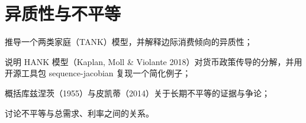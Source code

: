 \chapter{异质性与不平等}\label{ch:heterogeneity}

\begin{chapterguide}
\begin{guidegoals}
\item 推导一个两类家庭（TANK）模型，并解释边际消费倾向的异质性；
\item 说明 HANK 模型（Kaplan, Moll \& Violante 2018）对货币政策传导的分解，并用开源工具包 sequence-jacobian 复现一个简化例子；
\item 概括库兹涅茨（1955）与皮凯蒂（2014）关于长期不平等的证据与争论；
\item 讨论不平等与总需求、利率之间的关系。
\end{guidegoals}
\end{chapterguide}

\chapterstub
